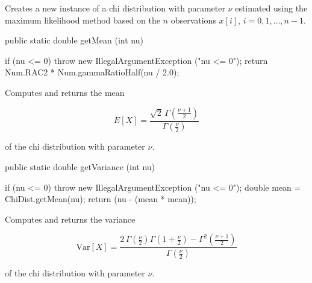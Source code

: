 \begin{tabb}
   Creates a new instance of a chi distribution with parameter $\nu$ estimated using
   the maximum likelihood method based on the $n$ observations $x[i]$,
   $i = 0, 1, \ldots, n-1$.
\end{tabb}
\begin{htmlonly}
\end{htmlonly}
\begin{code}

   public static double getMean (int nu)\begin{hide} {
      if (nu <= 0)
         throw new IllegalArgumentException ("nu <= 0");
      return  Num.RAC2 * Num.gammaRatioHalf(nu / 2.0);
   }\end{hide}
\end{code}
\begin{tabb}  Computes and returns the mean
\begin{latexonly}
   $$E[X] =  \frac{\sqrt{2}\,\Gamma( \frac{\nu + 1}{2} )}{\Gamma(\frac{\nu}{2})}$$
\end{latexonly}
   of the chi distribution with parameter $\nu$.
\end{tabb}
\begin{htmlonly}
\end{htmlonly}
\begin{code}

   public static double getVariance (int nu)\begin{hide} {
      if (nu <= 0)
         throw new IllegalArgumentException ("nu <= 0");
      double mean = ChiDist.getMean(nu);
      return (nu - (mean * mean));
   }\end{hide}
\end{code}
\begin{tabb}  Computes and returns the variance
\begin{latexonly}
  $$\mbox{Var}[X] = \frac{2\,\Gamma(\frac{\nu}{2}) \Gamma(1 + \frac{\nu}{2}) -
                    \Gamma^2(\frac{\nu + 1}{2})}{\Gamma (\frac{\nu}{2})}$$
\end{latexonly}
   of the chi distribution with parameter $\nu$.
\end{tabb}
\begin{htmlonly}
\end{htmlonly}
